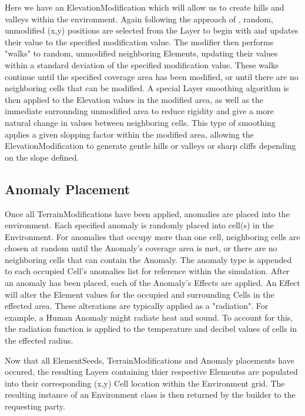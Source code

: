 Here we have an ElevationModification which will allow us to create hills and valleys within the environment.
Again following the approach of \cite{doran_controlled_2010}, random, unmodified (x,y) positions are selected from the Layer to begin with and updates their value to the specified modification value.
The modifier then performs "walks" to random, unmodified neighboring Elements, updating their values within a standard deviation of the specified modification value.
These walks continue until the specified coverage area has been modified, or until there are no neighboring cells that can be modified.
A special Layer smoothing algorithm is then applied to the Elevation values in the modified area, as well as the immediate surrounding unmodified area to reduce rigidity and give a more natural change in values between neighboring cells.
This type of smoothing applies a given slopping factor within the modified area, allowing the ElevationModification to generate gentle hills or valleys or sharp cliffs depending on the slope defined.


\subsection{Anomaly Placement}
Once all TerrainModifications have been applied, anomalies are placed into the environment.
Each specified anomaly is randomly placed into cell(s) in the Environment.
For anomalies that occupy more than one cell, neighboring cells are chosen at random until the Anomaly's coverage area is met, or there are no neighboring cells that can contain the Anomaly.
The anomaly type is appended to each occupied Cell's anomalies list for reference within the simulation.
After an anomaly has been placed, each of the Anomaly's Effects are applied.
An Effect will alter the Element values for the occupied and surrounding Cells in the effected area.
These alterations are typically applied as a "radiation".
For example, a Human Anomaly might radiate heat and sound.
To account for this, the radiation function is applied to the temperature and decibel values of cells in the effected radius.

Now that all ElementSeeds, TerrainModifications and Anomaly placements have occured, the resulting Layers containing thier respective Elementss are populated into their corresponding (x,y) Cell location within the Environment grid.
The resulting instance of an Environment class is then returned by the builder to the requesting party.



